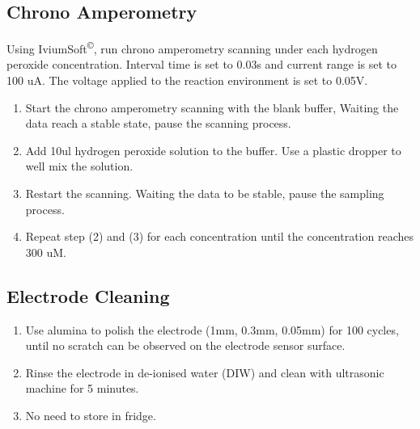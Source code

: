 \begin{appendices}
\subsection{Chrono Amperometry}
Using IviumSoft\textsuperscript{\copyright}, run chrono amperometry scanning under each hydrogen peroxide concentration. Interval time is set to 0.03s and current range is set to 100 uA. The voltage applied to the reaction environment is set to 0.05V.

\begin{enumerate}
    \item Start the chrono amperometry scanning with the blank buffer, Waiting the data reach a stable state, pause the scanning process. 
    \item Add 10ul hydrogen peroxide solution to the buffer. Use a plastic dropper to well mix the solution.
    \item Restart the scanning. Waiting the data to be stable, pause the sampling process. 
    \item Repeat step (2) and (3) for each concentration until the concentration reaches 300 uM.
\end{enumerate} 
\subsection{Electrode Cleaning}
\begin{enumerate}
    \item Use alumina to polish the electrode (1mm, 0.3mm, 0.05mm) for 100 cycles, until no scratch can be observed on the electrode sensor surface.
    \item Rinse the electrode in de-ionised water (DIW) and clean with ultrasonic machine for 5 minutes. 
    \item No need to store in fridge.
\end{enumerate}

\newpage

\end{appendices}
